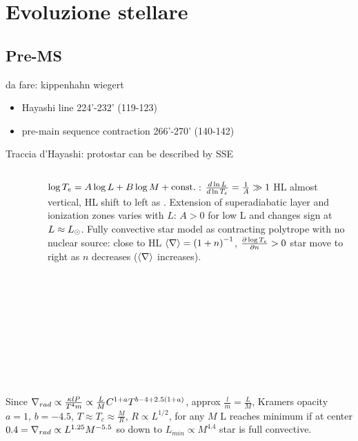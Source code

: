 \section{Evoluzione stellare}

\subsection{Pre-MS}

\begin{wordonframe}{da fare: kippenhahn wiegert}
	\begin{itemize}
		\item Hayashi line 224'-232' (119-123)
		\item pre-main sequence contraction 266'-270' (140-142)
	\end{itemize}
\end{wordonframe}

\begin{frame}{Traccia d'Hayashi: protostar can be described by SSE}
	\begin{columns}[T]
		\begin{column}{0.5\textwidth}
			\begin{figure}[!ht]\texttt{[image: hayatrack]}
			\end{figure}
		\end{column}
		\begin{column}{0.4\textwidth}
		$\log{T_e}=A\log{L}+B\log{M}+\const{}$: $\TDly{T_e}{L}=\frac{1}{A}\gg1$ HL almost vertical, HL shift to left as .
		Extension of superadiabatic layer and ionization zones varies with $L$: $A>0$ for low L and changes sign at $L\approx\lsun$.
		Fully convective star model as contracting polytrope with no nuclear source: close to HL $\exv{\nabla}=\invers{(1+n)}$, $\PDy{n}{\log{T_e}}>0$ star move to right as $n$ decreases ($\exv{\nabla}$ increases).
		\end{column}
	\end{columns}
Since $\nrad\propto\frac{\kappa l P}{T^4m}\propto\frac{L}{M}C^{1+a}T^{b-4+2.5(1+a)}$, approx $\frac{l}{m}=\frac{L}{M}$, Kramers opacity $a=1$, $b=-4.5$, $T\approx T_c\approx\frac{M}{R}$, $R\propto L^{1/2}$, for any $M$ L reaches minimum if at center $0.4=\nrad\propto L^{1.25}M^{-5.5}$ so  down to $L_{min}\propto M^{4.4}$ star is full convective.
\end{frame}

